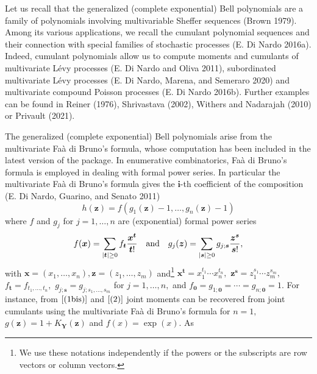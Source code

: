 Let us recall that the generalized (complete exponential) Bell polynomials are a family of polynomials involving multivariable Sheffer sequences (Brown 1979). Among its various applications, we recall the cumulant polynomial sequences and their connection with special families of stochastic processes (E. Di Nardo 2016a). Indeed, cumulant polynomials allow us to compute moments and cumulants of multivariate Lévy processes (E. Di Nardo and Oliva 2011), subordinated multivariate Lévy processes (E. Di Nardo, Marena, and Semeraro 2020) and multivariate compound Poisson processes (E. Di Nardo 2016b). Further examples can be found in Reiner (1976), Shrivastava (2002), Withers and Nadarajah (2010) or Privault (2021).

The generalized (complete exponential) Bell polynomials arise from the multivariate Faà di Bruno's formula, whose computation has been included in the latest version of the  package. In enumerative combinatorics, Faà di Bruno's formula is employed in dealing with formal power series. In particular the multivariate Faà di Bruno's formula gives the \(\boldsymbol{i}\)-th coefficient of the composition (E. Di Nardo, Guarino, and Senato 2011)
\begin{equation}
h(\boldsymbol{z}) = f\left(g_1(\boldsymbol{z})-1, \ldots,g_n(\boldsymbol{z})-1\right)
\label{mfaa1}
\end{equation}
where \(f\) and \(g_j\) for \(j=1, \ldots, n\) are (exponential) formal power series
\begin{equation} \label{multps1}
f(\boldsymbol{x})= \sum_{|\boldsymbol{t}| \geq 0} f_{\boldsymbol{t}} \frac{\boldsymbol{x}^{\boldsymbol{t}}}{\boldsymbol{t}!}
\quad \hbox{and} \quad 
g_j(\boldsymbol{z}) = \sum_{|\boldsymbol{s}| \geq 0} g_{j; \boldsymbol{s}} \frac{\boldsymbol{z}^{\boldsymbol{s}}}{\boldsymbol{s}!}, 
\end{equation}
with \(\boldsymbol{x}=(x_1, \ldots, x_n),\boldsymbol{z}=(z_1, \ldots, z_m)\) and\footnote{We use these notations independently if the powers or the subscripts are row vectors or column vectors.} \(\boldsymbol{x}^{\boldsymbol{t}} = x_1^{t_1} \cdots x_n^{t_n},\)
\({\boldsymbol{z}}^{\boldsymbol{s}} = z_1^{s_1} \cdots z_m^{s_m},\) \(f_{\boldsymbol{t}} = f_{t_1, \ldots, t_n},\) \(g_{j; \boldsymbol{s}} = g_{j; s_1, \ldots, s_m}\) for \(j=1,\ldots,n,\) and \(f_{\boldsymbol{0}}=g_{1; \boldsymbol{0}}= \cdots = g_{n; \boldsymbol{0}}=1.\) For instance, from \(\eqref{(1bis)}\) and \(\eqref{(2)}\) joint moments can be recovered from joint cumulants using the multivariate Faà di Bruno's formula for \(n=1,\) \(g(\boldsymbol{z}) = 1 + K_{\boldsymbol{Y}}(\boldsymbol{z})\) and \(f(x)=\exp(x).\) As
